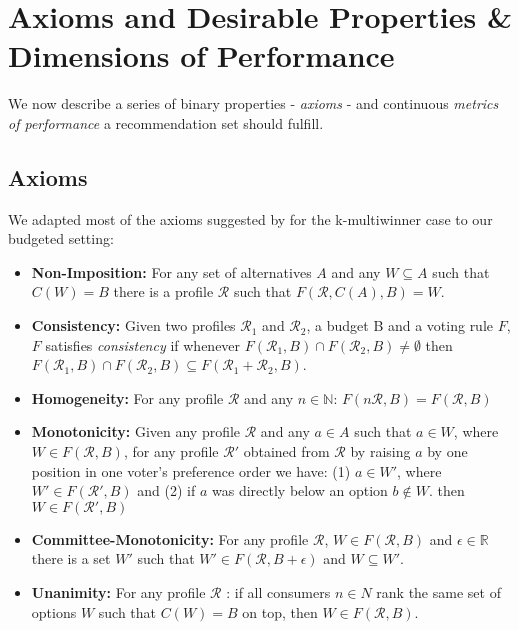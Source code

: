 \documentclass{article}
\begin{document}
\hypertarget{axioms}{\section{Axioms and Desirable Properties \& Dimensions of Performance}}%
We now describe a series of binary properties - {\em axioms} - and continuous {\em metrics of performance} a recommendation set should fulfill.

\subsection{Axioms}

We adapted most of the axioms suggested by  for the k-multiwinner case to our budgeted setting:

\begin{itemize}
	\item \textbf{Non-Imposition:} For any set of alternatives $A$ and any  $W\subseteq A$ such that $C(W) = B$ there is a profile $\mathcal{R}$ such that $F(\mathcal{R}, C(A), B)=W$.
	\item \textbf{Consistency:} Given two profiles $\mathcal{R}_1$ and $\mathcal{R}_2$, a budget B and a voting rule $F$, $F$ satisfies \emph{consistency} if whenever $F(\mathcal{R}_1, B)\cap F(\mathcal{R}_2, B )\neq \emptyset$ then $F(\mathcal{R}_1, B)\cap F(\mathcal{R}_2, B)\subseteq F(\mathcal{R}_1+\mathcal{R}_2, B)$.
	\item \textbf{Homogeneity:} For any profile $\mathcal{R}$ and any $n \in \mathbb{N}$: $F(n\mathcal{R}, B)=F(\mathcal{R}, B)$
	\item \textbf{Monotonicity:} Given any profile $\mathcal{R}$ and any $a \in A$ such that $a \in W$, where $W \in F(\mathcal{R}, B)$, for any profile $\mathcal{R'}$ obtained from $\mathcal{R}$ by raising $a$ by one position in one voter's preference order we have: (1) $a \in W'$, where $W' \in F(\mathcal{R'}, B)$ and (2) if $a$ was directly below an option $b \notin W$. then $W \in F(\mathcal{R'}, B)$

	\item \textbf{Committee-Monotonicity:} For any profile $\mathcal{R}$, $W \in F(\mathcal{R}, B)$ and $\epsilon\in\mathbb{R}$ there is a set $W'$ such that $W' \in F(\mathcal{R}, B + \epsilon)$ and $W \subseteq W'$.

	\item \textbf{Unanimity:} For any profile $\mathcal{R}$ : if all consumers $n \in N$ rank the same set of options $W$ such that $C(W) = B$ on top, then $W \in F(\mathcal{R}, B)$. %

\end{itemize}
\end{document}
